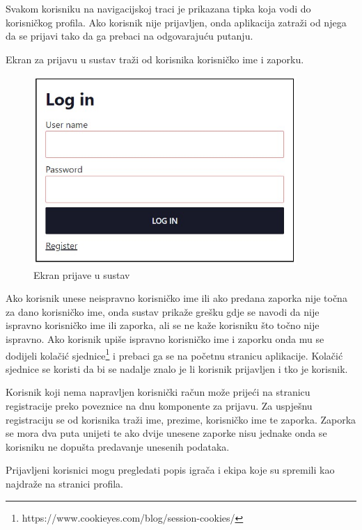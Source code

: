 \documentclass[times, utf8, zavrsni]{fer}
\begin{document}
Svakom korisniku na navigacijskoj traci je prikazana tipka koja vodi do korisničkog profila. Ako korisnik nije prijavljen, onda aplikacija zatraži od njega da se prijavi tako da ga prebaci na odgovarajuću putanju.

Ekran za prijavu u sustav traži od korisnika korisničko ime i zaporku.

\begin{figure}[htb]
\centering
\includegraphics[width=10cm]{images/login.jpg}
\caption{Ekran prijave u sustav}
\label{fig:login}
\end{figure}

Ako korisnik unese neispravno korisničko ime ili ako predana zaporka nije točna za dano korisničko ime, onda sustav prikaže grešku gdje se navodi da nije ispravno korisničko ime ili zaporka, ali se ne kaže korisniku što točno nije ispravno.
Ako korisnik upiše ispravno korisničko ime i zaporku onda mu se dodijeli kolačić sjednice\footnote{https://www.cookieyes.com/blog/session-cookies/} i prebaci ga se na početnu stranicu aplikacije.
Kolačić sjednice se koristi da bi se nadalje znalo je li korisnik prijavljen i tko je korisnik.

Korisnik koji nema napravljen korisnički račun može prijeći na stranicu registracije preko poveznice na dnu komponente za prijavu.
Za uspješnu registraciju se od korisnika traži ime, prezime, korisničko ime te zaporka. Zaporka se mora dva puta unijeti te ako dvije unesene zaporke nisu jednake onda se korisniku ne dopušta predavanje unesenih podataka.

Prijavljeni korisnici mogu pregledati popis igrača i ekipa koje su spremili kao najdraže na stranici profila.
\end{document}
